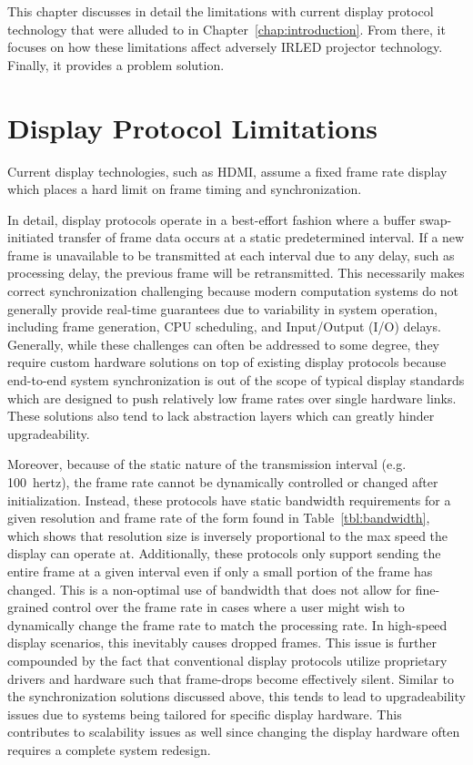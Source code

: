 \label{chap:problem_formulation}

This chapter discusses in detail the limitations with current display protocol technology that were alluded to in Chapter~\ref{chap:introduction}. From there, it focuses on how these limitations affect adversely IRLED projector technology. Finally, it provides a problem solution.

\section{Display Protocol Limitations}

    Current display technologies, such as HDMI, assume a fixed frame rate display which places a hard limit on frame timing and synchronization.

    In detail, display protocols operate in a best-effort fashion where a buffer swap-initiated transfer of frame data occurs at a static predetermined interval. If a new frame is unavailable to be transmitted at each interval due to any delay, such as processing delay, the previous frame will be retransmitted. This necessarily makes correct synchronization challenging because modern computation systems do not generally provide real-time guarantees due to variability in system operation, including frame generation, CPU scheduling, and Input/Output (I/O) delays. Generally, while these challenges can often be addressed to some degree, they require custom hardware solutions on top of existing display protocols because end-to-end system synchronization is out of the scope of typical display standards which are designed to push relatively low frame rates over single hardware links. These solutions also tend to lack abstraction layers which can greatly hinder upgradeability.

    Moreover, because of the static nature of the transmission interval (e.g. \mbox {100 hertz}), the frame rate cannot be dynamically controlled or changed after initialization. Instead, these protocols have static bandwidth requirements for a given resolution and frame rate of the form found in Table~\ref{tbl:bandwidth}, which shows that resolution size is inversely proportional to the max speed the display can operate at. Additionally, these protocols only support sending the entire frame at a given interval even if only a small portion of the frame has changed. This is a non-optimal use of bandwidth that does not allow for fine-grained control over the frame rate in cases where a user might wish to dynamically change the frame rate to match the processing rate. In high-speed display scenarios, this inevitably causes dropped frames. This issue is further compounded by the fact that conventional display protocols utilize proprietary drivers and hardware such that frame-drops become effectively silent. Similar to the synchronization solutions discussed above, this tends to lead to upgradeability issues due to systems being tailored for specific display hardware. This contributes to scalability issues as well since changing the display hardware often requires a complete system redesign.

